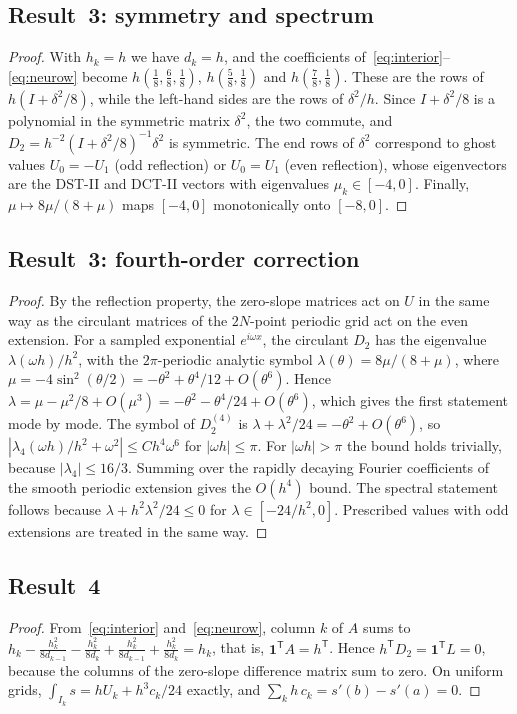 \documentclass[11pt]{article}
\begin{document}
\subsection*{Result~3: symmetry and spectrum}
\begin{proof}
With $h_k=h$ we have $d_k=h$, and the coefficients of~\eqref{eq:interior}--\eqref{eq:neurow} become
$h(\frac18,\frac68,\frac18)$, $h(\frac58,\frac18)$ and $h(\frac78,\frac18)$. These are the rows of
$h(I+\delta^2/8)$, while the left-hand sides are the rows of $\delta^2/h$. Since $I+\delta^2/8$ is a
polynomial in the symmetric matrix $\delta^2$, the two commute, and $D_2=h^{-2}(I+\delta^2/8)^{-1}\delta^2$ is
symmetric. The end rows of $\delta^2$ correspond to ghost values $U_0=-U_1$ (odd reflection) or $U_0=U_1$
(even reflection), whose eigenvectors are the DST-II and DCT-II vectors with eigenvalues $\mu_k\in[-4,0]$.
Finally, $\mu\mapsto8\mu/(8+\mu)$ maps $[-4,0]$ monotonically onto $[-8,0]$.
\end{proof}

\subsection*{Result~3: fourth-order correction}
\begin{proof}
By the reflection property, the zero-slope matrices act on $U$ in the same way as the circulant matrices
of the $2N$-point periodic grid act on the even extension. For a sampled exponential $e^{i\omega x}$, the
circulant $D_2$ has the eigenvalue $\lambda(\omega h)/h^2$, with the $2\pi$-periodic analytic symbol
$\lambda(\theta)=8\mu/(8+\mu)$, where $\mu=-4\sin^2(\theta/2)=-\theta^2+\theta^4/12+O(\theta^6)$. Hence
$\lambda=\mu-\mu^2/8+O(\mu^3)=-\theta^2-\theta^4/24+O(\theta^6)$, which gives the first statement mode by
mode. The symbol of $D_2^{(4)}$ is $\lambda+\lambda^2/24=-\theta^2+O(\theta^6)$, so
$|\lambda_4(\omega h)/h^2+\omega^2|\le Ch^4\omega^6$ for $|\omega h|\le\pi$. For $|\omega h|>\pi$ the bound
holds trivially, because $|\lambda_4|\le16/3$. Summing over the rapidly decaying Fourier coefficients of
the smooth periodic extension gives the $O(h^4)$ bound. The spectral statement follows because
$\lambda+h^2\lambda^2/24\le0$ for $\lambda\in[-24/h^2,0]$. Prescribed values with odd extensions are
treated in the same way.
\end{proof}

\subsection*{Result~4}
\begin{proof}
From~\eqref{eq:interior} and~\eqref{eq:neurow}, column $k$ of $A$ sums to
$h_k-\frac{h_k^2}{8d_{k-1}}-\frac{h_k^2}{8d_k}+\frac{h_k^2}{8d_{k-1}}+\frac{h_k^2}{8d_k}=h_k$, that is,
$\mathbf 1^{\mathsf T}A=h^{\mathsf T}$. Hence $h^{\mathsf T}D_2=\mathbf 1^{\mathsf T}L=0$, because the columns of
the zero-slope difference matrix sum to zero. On uniform grids, $\int_{I_k}s=hU_k+h^3c_k/24$ exactly, and
$\sum_kh\,c_k=s'(b)-s'(a)=0$.
\end{proof}
\end{document}
